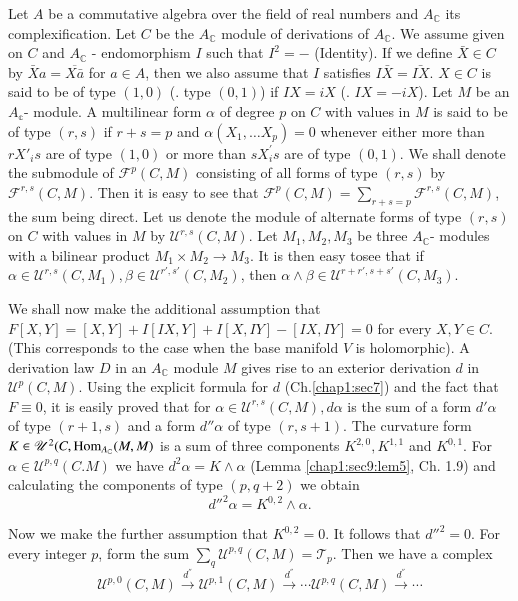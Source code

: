 Let $A$ be a commutative algebra over the field of real numbers and
$A_{\mathbb{C}}$ its complexification. Let $C$ be the $A_{\mathbb{C}}$
module of derivations of $A_\mathbb{C}$. We assume given on $C$ and
$A_\mathbb{C}$ - endomorphism $I$ such that $I^2 = - $ (Identity). If
we define $\bar{X} \in C$ by $\bar{X}a = \overline{X \bar{a} }$ for $a
\in A$, then we also assume that $I$ satisfies $I\bar{X} = \bar{IX}$. $X
\in C$ is said to be of type $(1, 0)$ (\resp. type $(0, 1)$) if $IX =
iX$ (\resp. $IX = - iX$). Let $M$ be an $A_{\mathbb{c}}$- module. A
multilinear form $\alpha$ of degree $p$ on $C$ with values in $M$ is
said to be of type $(r, s)$ if $r + s = p$ and $\alpha (X_1, \ldots
X_p) = 0$ whenever either more than $r X'_i s$ are of type $(1, 0)$
or more than $s X^{'}_i s$ are of type $(0, 1)$. We shall denote the
submodule of $\mathscr{F}^{p} (C, M)$ consisting of all forms of
type $(r, s)$ by $\mathscr{F}^{r, s} (C, M)$. Then it is easy to see
that $\mathscr{F}^p (C, M) = \sum\limits_{r + s = p} \mathscr{F}^{r,
  s} (C, M)$, the sum being direct. Let us denote the module of
alternate forms of type $(r, s)$ on $C$ with values in $M$ by
$\mathscr{U}^{r, s} (C, M)$. Let $M_1, M_2, M_3$ be three
$A_{\mathbb{C}}$- modules with a bilinear product $M_1 \times M_2 \to
M_3$. It is then easy to\pageoriginale see that if $\alpha \in \mathscr{U}^{r, s}
(C, M_1), \beta \in \mathscr{U}^{r' , s'} (C, M_2)$, then $\alpha
\wedge \beta \in \mathscr{U}^{r + r', s + s'} (C, M_3)$. 

We shall now make the additional assumption that $F[X, Y] = [X, Y] + I
[IX, Y] + I [X, IY] - [IX, IY] = 0$ for every $X, Y \in C$. (This
corresponds to the case when the base manifold $V$ is holomorphic). A
derivation law $D$ in an $A_\mathbb{C}$ module $M$ gives rise to an
exterior derivation $d$ in $\mathscr{U}^p (C, M)$. Using the explicit
formula for $d$ (Ch.\ref{chap1:sec7}) and the fact that $F \equiv 0$, it is
easily proved that for $\alpha \in \mathscr{U}^{r, s} (C, M), d
\alpha$ is the sum of a form $d '\alpha$ of type $(r + 1, s)$ and a
form $d'' \alpha$ of type $(r, s+ 1)$. The curvature form $K \in
\mathscr{U}^2 (C, \operatorname{Hom}_{A_\mathbb{C}} (M, M)$ is a sum of three
components $K^{2, 0}, K^{1, 1}$ and $K^{0 , 1}$. For $\alpha \in
\mathscr{U}^{p, q} (C. M)$ we have $d^2 \alpha = K \wedge \alpha$
(Lemma \ref{chap1:sec9:lem5}, Ch. 1.9) and calculating the components
of type $(p, q + 2)$ we obtain 
$$
d''^2 \alpha = K^{0, 2} \wedge \alpha. 
$$

Now we make the further assumption that $K^{0, 2} = 0$. It follows
that $d''^2 = 0$. For every integer $p$, form the sum
$\sum\limits_{q}\mathscr{U}^{ p, q} (C, M) = \mathscr{T}_p$. Then we have a
complex 
$$
\mathscr{U}^{p, 0} (C, M) \xrightarrow{d^{''}}\mathscr{U}^{p, 1} (C,
M) \xrightarrow{d^{''}} \cdots \mathscr{U}^{p, q} (C, M)
\xrightarrow{d^{''}} \cdots 
$$

